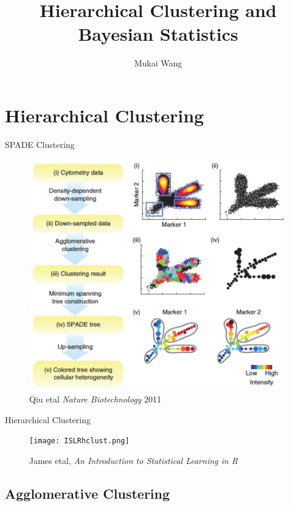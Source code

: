 \documentclass{beamer}
\title[Bayesian Hierarchical Clustering]{Hierarchical Clustering and Bayesian Statistics}
\author{Mukai Wang}
\begin{document}
	
	
	\begin{frame}
		\titlepage
	\end{frame}
	
	\begin{frame}
		\tableofcontents[hideallsubsections]
	\end{frame}

	\section{Hierarchical Clustering}
	
	
	
	
	\begin{frame}{SPADE Clustering}
		\begin{figure}[htbp]
			\centering
			\includegraphics[scale=0.45]{SPADE.png}
			\caption*{Qiu etal \emph{Nature Biotechnology} 2011}
		\end{figure}
	\end{frame}
	
	\begin{frame}{Hierarchical Clustering}
		\begin{figure}[htbp]
			\centering
			\texttt{[image: ISLRhclust.png]}
			\caption*{James etal, \emph{An Introduction to Statistical Learning in R}}
		\end{figure}
	\end{frame}
	\subsection{Agglomerative Clustering}
	\begin{frame}
		\tableofcontents
		[
		currentsection,
		currentsubsection,
		subsectionstyle=show/shaded/hide
		]
	\end{frame}
	
\end{document}

